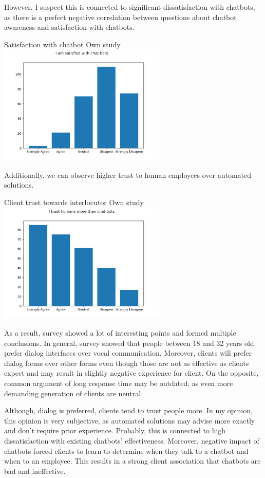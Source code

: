 However, I suspect this is connected to significant dissatisfaction with chatbots, as there is a perfect negative correlation between questions about chatbot awareness and satisfaction with chatbots.

\mtfigure
{Satisfaction with chatbot}
{Own study}
{
    \includegraphics[width=0.6\textwidth,height=\textheight,keepaspectratio]{survey/8_i_am_satisfied_with_chat-bots.png}
}    

Additionally, we can observe higher trust to human employees over automated solutions.

\mtfigure
{Client trust towards interlocutor}
{Own study}
{
    \includegraphics[width=0.6\textwidth,height=\textheight,keepaspectratio]{survey/9_i_trust_humans_more_than_chat-bots.png}
}

As a result, survey showed a lot of interesting points and formed multiple conclusions.
In general, survey showed that people between 18 and 32 years old prefer dialog interfaces over vocal communication.
Moreover, clients will prefer dialog forms over other forms even though those are not as effective as clients expect and may result in slightly negative experience for client.
On the opposite, common argument of long response time may be outdated, as even more demanding generation of clients are neutral.

Although, dialog is preferred, clients tend to trust people more.
In my opinion, this opinion is very subjective, as automated solutions may advise more exactly and don't require prior experience.
Probably, this is connected to high dissatisfaction with existing chatbots' effectiveness.
Moreover, negative impact of chatbots forced clients to learn to determine when they talk to a chatbot and when to an employee.
This results in a strong client association that chatbots are bad and ineffective.

